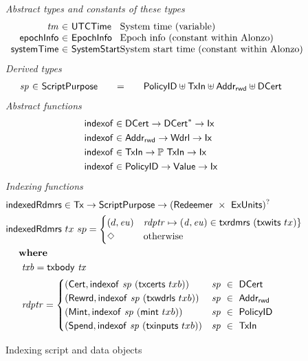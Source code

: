 \begin{figure}[htb]
  \emph{Abstract types and constants of these types}
  \begin{equation*}
    \begin{array}{r@{~\in~}l@{}lr}
      \var{tm}
      & \UTCTime
      & \text{System time (variable)} \\
      \mathsf{epochInfo}
      & \EpochInfo
      & \text{Epoch info (constant within Alonzo)} \\
      \mathsf{systemTime}
      & \SystemStart
      & \text{System start time (constant within Alonzo)}
    \end{array}
  \end{equation*}
  \emph{Derived types}
  \begin{equation*}
    \begin{array}{r@{~\in~}l@{\qquad=\qquad}lr}
      \var{sp}
      & \ScriptPurpose
      & \PolicyID \uniondistinct \TxIn \uniondistinct \AddrRWD \uniondistinct \DCert
    \end{array}
  \end{equation*}
  \emph{Abstract functions}
  \begin{align*}
    &\mathsf{indexof} \in \mathsf{DCert} \to \mathsf{DCert}^{*} \to \mathsf{Ix}\\
    &\mathsf{indexof} \in \mathsf{Addr_{rwd}} \to \mathsf{Wdrl} \to \mathsf{Ix}\\
    &\mathsf{indexof} \in \mathsf{TxIn} \to \mathbb{P}~\mathsf{TxIn} \to \mathsf{Ix}\\
    &\mathsf{indexof} \in \mathsf{PolicyID} \to \mathsf{Value} \to \mathsf{Ix}
  \end{align*}
  \emph{Indexing functions}
  \begin{align*}
    &\mathsf{indexedRdmrs} \in \mathsf{Tx} \to \mathsf{ScriptPurpose} \to (\mathsf{Redeemer}~\times~\mathsf{ExUnits})^?\\
    &\mathsf{indexedRdmrs}~tx~sp =
      \begin{cases}
        (d, \mathit{eu}) & \mathit{rdptr} \mapsto (\mathit{d}, \mathit{eu}) \in \mathsf{txrdmrs}~(\mathsf{txwits}~{tx}) \} \\
        \Diamond & \text{otherwise}
      \end{cases} \\
    & ~~~ ~ \mathbf{where}~ ~  \\
    & ~~\quad \mathit{txb} = \mathsf{txbody}~ \mathit{tx} \\
    & ~~\quad \mathit{rdptr} = \begin{cases}
        (\mathsf{Cert},\mathsf{indexof}~\mathit{sp}~(\mathsf{txcerts}~{txb}))   & \mathit{sp}~\in~\mathsf{DCert} \\
        (\mathsf{Rewrd},\mathsf{indexof}~\mathit{sp}~(\mathsf{txwdrls}~{txb}))   & \mathit{sp}~\in~\mathsf{Addr_{rwd}} \\
        (\mathsf{Mint},\mathsf{indexof}~\mathit{sp}~(\mathsf{mint}~{txb}))    & \mathit{sp}~\in~\mathsf{PolicyID} \\
        (\mathsf{Spend},\mathsf{indexof}~\mathit{sp}~(\mathsf{txinputs}~{txb})) & \mathit{sp}~\in~\mathsf{TxIn}
      \end{cases}
  \end{align*}
  \caption{Indexing script and data objects}
  \label{fig:functions:script1}
\end{figure}


